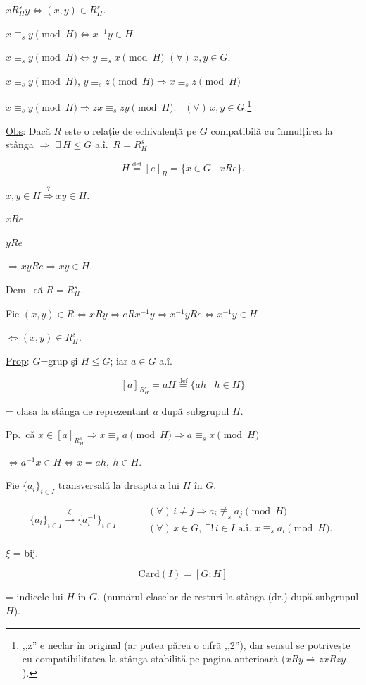 \documentclass[12pt]{article}
\begin{document}
\noindent $xR_H^s y \Leftrightarrow (x,y)\in R_H^s$.

\noindent $x\equiv_s y \pmod H \Leftrightarrow x^{-1}y\in H$.

\bigskip
\noindent $x\equiv_s y \pmod H \Leftrightarrow y\equiv_s x \pmod H$ $(\forall)\, x,y\in G$.

\noindent $x\equiv_s y \pmod H$, $y\equiv_s z \pmod H \Rightarrow x\equiv_s z \pmod H$

\bigskip
\noindent $x\equiv_s y \pmod H \Rightarrow zx\equiv_s zy \pmod H$. \ $(\forall)\, x,y\in G$.\footnote{,,z'' e neclar în original (ar putea părea o cifră ,,2''), dar sensul se potrivește cu compatibilitatea la stânga stabilită pe pagina anterioară ($xRy\Rightarrow zxRzy$).}

\bigskip
\noindent\underline{Obs}: Dacă $R$ este o relație de echivalență pe $G$ compatibilă cu înmulțirea la stânga $\Rightarrow$ $\exists\, H\leq G$ a.î.\ $R=R_H^s$

\[
H \overset{\text{def}}{=} [e]_R = \{x\in G \mid xRe\}.
\]

\noindent $x,y\in H \overset{?}{\Rightarrow} xy\in H$.

\noindent $xRe$

\noindent $yRe$

\noindent $\Rightarrow xyRe \Rightarrow xy\in H$.

\bigskip
\noindent Dem.\ că $R=R_H^s$.

\noindent Fie $(x,y)\in R \Leftrightarrow xRy \Leftrightarrow eRx^{-1}y \Leftrightarrow x^{-1}yRe \Leftrightarrow x^{-1}y\in H$

\noindent $\Leftrightarrow (x,y)\in R_H^s$.

\bigskip
\noindent\underline{Prop}: $G$=grup şi $H\leq G$; iar $a\in G$ a.î.

\[
[a]_{R_H^s} = aH \overset{\text{def}}{=} \{ah \mid h\in H\}
\]

\noindent = clasa la stânga de reprezentant $a$ după subgrupul $H$.

\bigskip
\noindent Pp.\ că $x\in[a]_{R_H^s} \Rightarrow x\equiv_s a \pmod H \Rightarrow a\equiv_s x \pmod H$

\noindent $\Leftrightarrow a^{-1}x\in H \Leftrightarrow x=ah,\ h\in H$.

\bigskip
\noindent Fie $\{a_i\}_{i\in I}$ transversală la dreapta a lui $H$ în $G$.

\[
\{a_i\}_{i\in I} \xrightarrow{\ \xi\ } \{a_i^{-1}\}_{i\in I} \qquad
\begin{aligned}
&(\forall)\, i\neq j \Rightarrow a_i \not\equiv_s a_j \pmod H\\
&(\forall)\, x\in G,\ \exists!\, i\in I \text{ a.î. } x\equiv_s a_i \pmod H.
\end{aligned}
\]

\noindent $\xi$ = bij.

\[
\text{Card}(I) = [G:H]
\]

\noindent = indicele lui $H$ în $G$. (numărul claselor de resturi la stânga (dr.) după subgrupul $H$).
\end{document}
